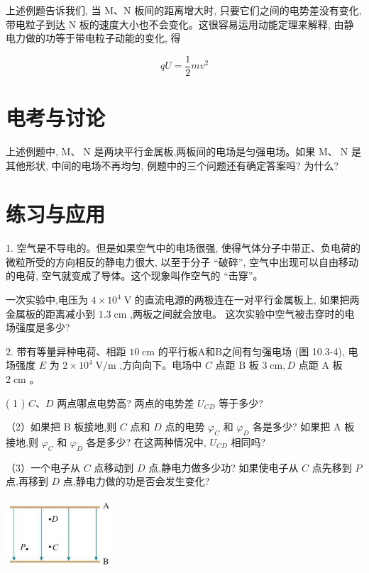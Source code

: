 \documentclass[10pt]{article}
\begin{document}
上述例题告诉我们, 当 M、N 板间的距离增大时, 只要它们之间的电势差没有变化,带电粒子到达 \(\mathrm{N}\) 板的速度大小也不会变化。这很容易运用动能定理来解释, 由静电力做的功等于带电粒子动能的变化, 得

\[
{qU} = \frac{1}{2}m{v}^{2}
\]

\section*{电考与讨论}

上述例题中, \(\mathrm{M}\text{、}\mathrm{\;N}\) 是两块平行金属板,两板间的电场是匀强电场。如果 \(\mathrm{M}\text{、}\mathrm{\;N}\) 是其他形状, 中间的电场不再均匀, 例题中的三个问题还有确定答案吗? 为什么?

\section*{练习与应用}

1. 空气是不导电的。但是如果空气中的电场很强, 使得气体分子中带正、负电荷的微粒所受的方向相反的静电力很大, 以至于分子 “破碎”, 空气中出现可以自由移动的电荷, 空气就变成了导体。这个现象叫作空气的 “击穿”。

一次实验中,电压为 \(4 \times {10}^{4}\mathrm{\;V}\) 的直流电源的两极连在一对平行金属板上, 如果把两金属板的距离减小到 \({1.3}\mathrm{\;{cm}}\) ,两板之间就会放电。 这次实验中空气被击穿时的电场强度是多少?

2. 带有等量异种电荷、相距 \({10}\mathrm{\;{cm}}\) 的平行板A和B之间有匀强电场 (图 10.3-4), 电场强度 \(E\) 为 \(2 \times {10}^{4}\mathrm{\;V}/\mathrm{m}\) ,方向向下。电场中 \(C\) 点距 \(\mathrm{B}\) 板 \(3\mathrm{\;{cm}},D\) 点距 \(\mathrm{A}\) 板 \(2\mathrm{\;{cm}}\) 。

( 1 ) \(C\text{、}D\) 两点哪点电势高? 两点的电势差 \({U}_{CD}\) 等于多少?

（2）如果把 \(\mathrm{B}\) 板接地,则 \(C\) 点和 \(D\) 点的电势 \({\varphi }_{C}\) 和 \({\varphi }_{D}\) 各是多少? 如果把 \(\mathrm{A}\) 板接地,则 \({\varphi }_{C}\) 和 \({\varphi }_{D}\) 各是多少? 在这两种情况中, \({U}_{CD}\) 相同吗?

（3）一个电子从 \(C\) 点移动到 \(D\) 点,静电力做多少功? 如果使电子从 \(C\) 点先移到 \(P\) 点,再移到 \(D\) 点,静电力做的功是否会发生变化?

\begin{center}
\includegraphics[max width=0.3\textwidth]{images/01911d5f-8e38-70c0-b5b8-2b399bd115b6_42_836621.jpg}
\end{center}
\end{document}
